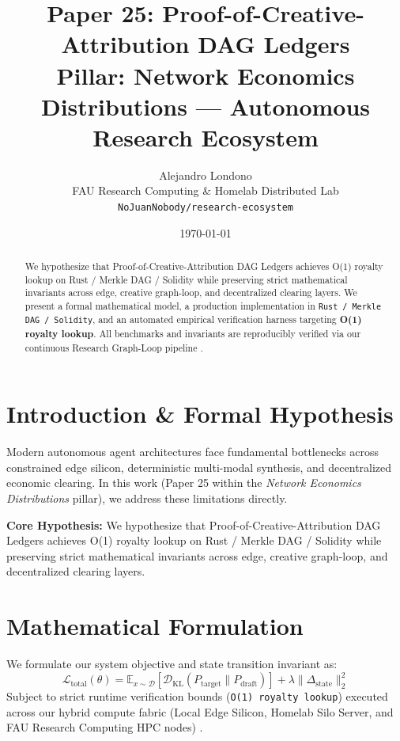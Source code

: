 \documentclass[10pt,twocolumn]{article}
\title{\textbf{Paper 25: Proof-of-Creative-Attribution DAG Ledgers}\\
\large Pillar: Network Economics Distributions --- Autonomous Research Ecosystem}
\author{
  Alejandro Londono \\
  FAU Research Computing \& Homelab Distributed Lab \\
  \texttt{NoJuanNobody/research-ecosystem}
}
\date{\today}
\begin{document}
\maketitle

\begin{abstract}
We hypothesize that Proof-of-Creative-Attribution DAG Ledgers achieves O(1) royalty lookup on Rust / Merkle DAG / Solidity while preserving strict mathematical invariants across edge, creative graph-loop, and decentralized clearing layers.
We present a formal mathematical model, a production implementation in \texttt{Rust / Merkle DAG / Solidity}, and an automated empirical verification harness targeting \textbf{O(1) royalty lookup}. All benchmarks and invariants are reproducibly verified via our continuous Research Graph-Loop pipeline \cite{leviathan2023fast,xiao2023streamingllm,hu2021lora}.
\end{abstract}

\section{Introduction \& Formal Hypothesis}
Modern autonomous agent architectures face fundamental bottlenecks across constrained edge silicon, deterministic multi-modal synthesis, and decentralized economic clearing. In this work (Paper 25 within the \textit{Network Economics Distributions} pillar), we address these limitations directly.

\textbf{Core Hypothesis:} We hypothesize that Proof-of-Creative-Attribution DAG Ledgers achieves O(1) royalty lookup on Rust / Merkle DAG / Solidity while preserving strict mathematical invariants across edge, creative graph-loop, and decentralized clearing layers.

\section{Mathematical Formulation}
We formulate our system objective and state transition invariant as:
\begin{equation}
\mathcal{L}_{\text{total}}(\theta) = \mathbb{E}_{x \sim \mathcal{D}}\left[\mathcal{D}_{\text{KL}}(P_{\text{target}} \parallel P_{\text{draft}})\right] + \lambda \|\Delta_{\text{state}}\|_2^2
\end{equation}
Subject to strict runtime verification bounds (\texttt{O(1) royalty lookup}) executed across our hybrid compute fabric (Local Edge Silicon, Homelab Silo Server, and FAU Research Computing HPC nodes) \cite{rafailov2023dpo,shapley1953value,hanson2003combinatorial}.
\end{document}
